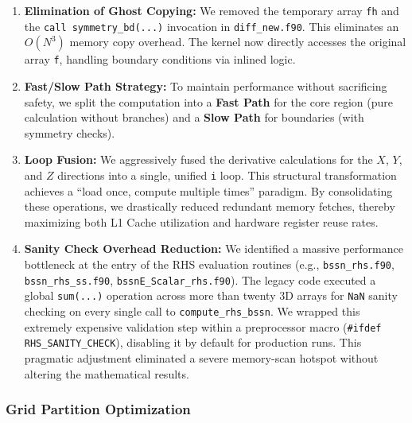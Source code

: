 \begin{enumerate}
    \item \textbf{Elimination of Ghost Copying:} We removed the temporary array \texttt{fh} and the \newline\texttt{call symmetry\_bd(...)} invocation in \texttt{diff\_new.f90}. 
    This eliminates an $O(N^3)$ memory copy overhead. 
    The kernel now directly accesses the original array \texttt{f}, handling boundary conditions via inlined logic.
    
    \item \textbf{Fast/Slow Path Strategy:} To maintain performance without sacrificing safety, we split the computation into a \textbf{Fast Path} for the core region (pure calculation without branches) and a \textbf{Slow Path} for boundaries (with symmetry checks).
    
    \item \textbf{Loop Fusion:} We aggressively fused the derivative calculations for the $X$, $Y$, and $Z$ directions into a single, unified \texttt{i} loop. This structural transformation achieves a ``load once, compute multiple times'' paradigm. By consolidating these operations, we drastically reduced redundant memory fetches, thereby maximizing both L1 Cache utilization and hardware register reuse rates.
    
    \item \textbf{Sanity Check Overhead Reduction:} We identified a massive performance bottleneck at the entry of the RHS evaluation routines (e.g., \texttt{bssn\_rhs.f90}, \newline \texttt{bssn\_rhs\_ss.f90}, \texttt{bssnE\_Scalar\_rhs.f90}). 
    The legacy code executed a global \texttt{sum(...)} operation across more than twenty 3D arrays for \texttt{NaN} sanity checking on every single call to \texttt{compute\_rhs\_bssn}.
    We wrapped this extremely expensive validation step within a preprocessor macro (\texttt{\#ifdef RHS\_SANITY\_CHECK}), disabling it by default for production runs. 
    This pragmatic adjustment eliminated a severe memory-scan hotspot without altering the mathematical results.
\end{enumerate}

\subsubsection{Grid Partition Optimization}
\ 

